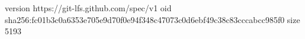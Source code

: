 version https://git-lfs.github.com/spec/v1
oid sha256:fc01b3c0a6353e705e9d70f0e94f348c47073c0d6ebf49c38c83cccabcc985f0
size 5193
